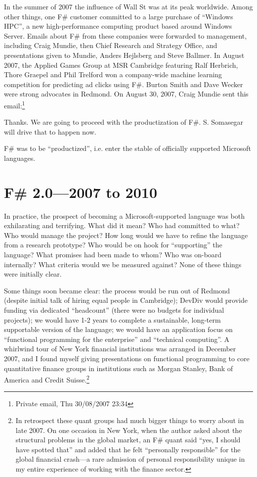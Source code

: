 \documentclass[acmsmall]{acmart}\settopmatter{}
\begin{document}
In the summer of 2007 the influence of Wall St was at its peak worldwide. Among other things, one F\# customer
committed to a large purchase of “Windows HPC”, a new high-performance computing product based around
Windows Server. Emails about F\# from these companies were forwarded to management, including Craig Mundie,
then Chief Research and Strategy Office, and presentations given to Mundie, Anders Hejlsberg and Steve Ballmer.
In August 2007, the Applied Games Group at MSR Cambridge featuring Ralf Herbrich, Thore Graepel and Phil
Trelford won a company-wide machine learning competition for predicting ad clicks using F\#.  Burton Smith and
Dave Wecker were strong advocates in Redmond. On August 30, 2007, Craig Mundie sent this email:\footnote{Private email, Thu 30/08/2007 23:34}
\begin{verbquote}
Thanks.  We are going to proceed with the productization of F#.  S. Somasegar will drive that to happen now.
\end{verbquote}
F\# was to be “productized”, i.e. enter the stable of officially supported Microsoft languages.

\section*{F\# 2.0---2007 to 2010}

In practice, the prospect of becoming a Microsoft-supported language was both exhilarating and terrifying. What did
it mean? Who had committed to what?  Who would manage the project? How long would we have to refine the
language from a research prototype?  Who would be on hook for “supporting” the language? What promises
had been made to whom? Who was on-board internally? What criteria would we be measured against?  None of these things were initially clear.  

Some things soon became clear: the process would be run out of Redmond (despite initial talk of hiring equal people in
Cambridge); DevDiv would provide funding via dedicated “headcount” (there were no budgets for individual projects); we
would have 1-2 years to complete a sustainable, long-term supportable version of the language; we would have an
application focus on “functional programming for the enterprise” and “technical computing”. A whirlwind tour of New York
financial institutions was arranged in December 2007, and I found myself giving presentations on functional programming
to core quantitative finance groups in institutions such as Morgan Stanley, Bank of America and
Credit Suisse.\footnote{In retrospect these quant groups had much bigger things to worry about in
late 2007. On one occasion in New York, when the author asked about the structural problems in the
global market, an F\# quant said “yes, I should have spotted that” and added that he felt “personally
responsible” for the global financial crash---a rare admission of personal responsibility unique in my entire
experience of working with the finance sector.}
\end{document}

